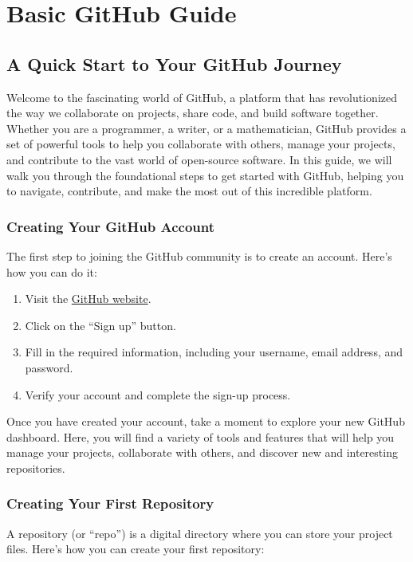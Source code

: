 \documentclass[a4paper,12pt]{book}
\begin{document}
\chapter{Basic GitHub Guide}
\section*{A Quick Start to Your GitHub Journey}

Welcome to the fascinating world of GitHub, a platform that has revolutionized the way we collaborate on projects, share code, and build software together. Whether you are a programmer, a writer, or a mathematician, GitHub provides a set of powerful tools to help you collaborate with others, manage your projects, and contribute to the vast world of open-source software. In this guide, we will walk you through the foundational steps to get started with GitHub, helping you to navigate, contribute, and make the most out of this incredible platform.

\subsection*{Creating Your GitHub Account}

The first step to joining the GitHub community is to create an account. Here’s how you can do it:

\begin{enumerate}
    \item Visit the \href{https://github.com/}{GitHub website}.
    \item Click on the “Sign up” button.
    \item Fill in the required information, including your username, email address, and password.
    \item Verify your account and complete the sign-up process.
\end{enumerate}

Once you have created your account, take a moment to explore your new GitHub dashboard. Here, you will find a variety of tools and features that will help you manage your projects, collaborate with others, and discover new and interesting repositories.

\subsection*{Creating Your First Repository}

A repository (or “repo”) is a digital directory where you can store your project files. Here’s how you can create your first repository:
\end{document}
